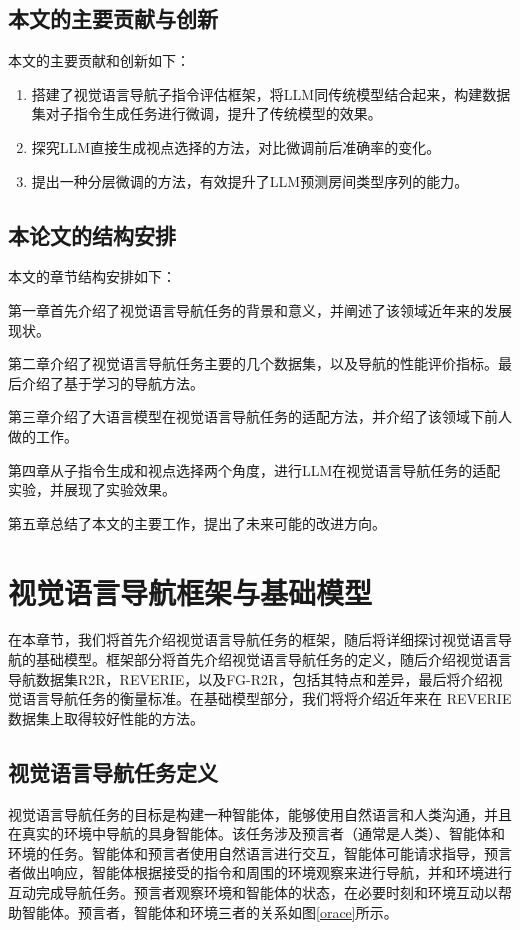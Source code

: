 \documentclass[bachelor]{thesis-uestc}
\begin{document}
\section{本文的主要贡献与创新}

本文的主要贡献和创新如下：
\begin{enumerate}
    \item 搭建了视觉语言导航子指令评估框架，将LLM同传统模型结合起来，构建数据集对子指令生成任务进行微调，提升了传统模型的效果。
    \item 探究LLM直接生成视点选择的方法，对比微调前后准确率的变化。
    \item 提出一种分层微调的方法，有效提升了LLM预测房间类型序列的能力。
\end{enumerate}
\section{本论文的结构安排}

本文的章节结构安排如下：

第一章首先介绍了视觉语言导航任务的背景和意义，并阐述了该领域近年来的发展现状。

第二章介绍了视觉语言导航任务主要的几个数据集，以及导航的性能评价指标。最后介绍了基于学习的导航方法。

第三章介绍了大语言模型在视觉语言导航任务的适配方法，并介绍了该领域下前人做的工作。

第四章从子指令生成和视点选择两个角度，进行LLM在视觉语言导航任务的适配实验，并展现了实验效果。

第五章总结了本文的主要工作，提出了未来可能的改进方向。

\chapter{视觉语言导航框架与基础模型}

在本章节，我们将首先介绍视觉语言导航任务的框架，随后将详细探讨视觉语言导航的基础模型。框架部分将首先介绍视觉语言导航任务的定义，随后介绍视觉语言导航数据集R2R，REVERIE，以及FG-R2R，包括其特点和差异，最后将介绍视觉语言导航任务的衡量标准。在基础模型部分，我们将将介绍近年来在 REVERIE 数据集上取得较好性能的方法。

\section{视觉语言导航任务定义}

视觉语言导航任务的目标是构建一种智能体，能够使用自然语言和人类沟通，并且在真实的环境中导航的具身智能体。该任务涉及预言者（通常是人类）、智能体和环境的任务。智能体和预言者使用自然语言进行交互，智能体可能请求指导，预言者做出响应，智能体根据接受的指令和周围的环境观察来进行导航，并和环境进行互动完成导航任务。预言者观察环境和智能体的状态，在必要时刻和环境互动以帮助智能体。预言者，智能体和环境三者的关系如图\ref{orace}\cite{guVisionandLanguageNavigationSurvey2022}所示。
\end{document}
